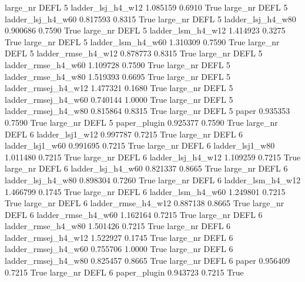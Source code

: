   large_nr     DEFL                 5   ladder_lsj_h4_w12    1.085159      0.6910    True
  large_nr     DEFL                 5   ladder_lsj_h4_w60    0.817593      0.8315    True
  large_nr     DEFL                 5   ladder_lsj_h4_w80    0.900686      0.7590    True
  large_nr     DEFL                 5   ladder_lsm_h4_w12    1.414923      0.3275    True
  large_nr     DEFL                 5   ladder_lsm_h4_w60    1.310309      0.7590    True
  large_nr     DEFL                 5  ladder_rmse_h4_w12    0.878773      0.8315    True
  large_nr     DEFL                 5  ladder_rmse_h4_w60    1.109728      0.7590    True
  large_nr     DEFL                 5  ladder_rmse_h4_w80    1.519393      0.6695    True
  large_nr     DEFL                 5 ladder_rmsej_h4_w12    1.477321      0.1680    True
  large_nr     DEFL                 5 ladder_rmsej_h4_w60    0.740144      1.0000    True
  large_nr     DEFL                 5 ladder_rmsej_h4_w80    0.815864      0.8315    True
  large_nr     DEFL                 5               paper    0.935353      0.7590    True
  large_nr     DEFL                 5        paper_plugin    0.925377      0.7590    True
  large_nr     DEFL                 6     ladder_lsj1_w12    0.997787      0.7215    True
  large_nr     DEFL                 6     ladder_lsj1_w60    0.991695      0.7215    True
  large_nr     DEFL                 6     ladder_lsj1_w80    1.011480      0.7215    True
  large_nr     DEFL                 6   ladder_lsj_h4_w12    1.109259      0.7215    True
  large_nr     DEFL                 6   ladder_lsj_h4_w60    0.821337      0.8665    True
  large_nr     DEFL                 6   ladder_lsj_h4_w80    0.898304      0.7260    True
  large_nr     DEFL                 6   ladder_lsm_h4_w12    1.466799      0.1745    True
  large_nr     DEFL                 6   ladder_lsm_h4_w60    1.249801      0.7215    True
  large_nr     DEFL                 6  ladder_rmse_h4_w12    0.887138      0.8665    True
  large_nr     DEFL                 6  ladder_rmse_h4_w60    1.162164      0.7215    True
  large_nr     DEFL                 6  ladder_rmse_h4_w80    1.501426      0.7215    True
  large_nr     DEFL                 6 ladder_rmsej_h4_w12    1.522927      0.1745    True
  large_nr     DEFL                 6 ladder_rmsej_h4_w60    0.755706      1.0000    True
  large_nr     DEFL                 6 ladder_rmsej_h4_w80    0.825457      0.8665    True
  large_nr     DEFL                 6               paper    0.956409      0.7215    True
  large_nr     DEFL                 6        paper_plugin    0.943723      0.7215    True
